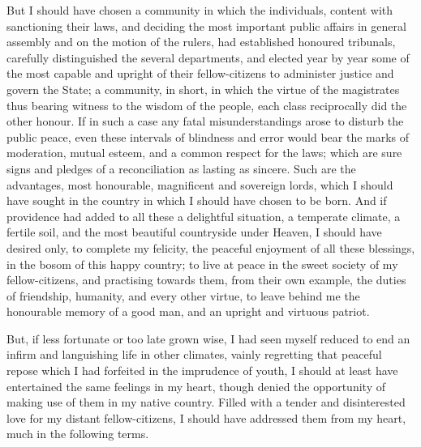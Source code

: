 \documentclass[12pt]{report}
\begin{document}
But I should have chosen a community in which the individuals, content with sanctioning their laws, and deciding the most important public affairs in general assembly and on the motion of the rulers, had established honoured tribunals, carefully distinguished the several departments, and elected year by year some of the most capable and upright of their fellow-citizens to administer justice and govern the State; a community, in short, in which the virtue of the magistrates thus bearing witness to the wisdom of the people, each class reciprocally did the other honour. If in such a case any fatal misunderstandings arose to disturb the public peace, even these intervals of blindness and error would bear the marks of moderation, mutual esteem, and a common respect for the laws; which are sure signs and pledges of a reconciliation as lasting as sincere. Such are the advantages, most honourable, magnificent and sovereign lords, which I should have sought in the country in which I should have chosen to be born. And if providence had added to all these a delightful situation, a temperate climate, a fertile soil, and the most beautiful countryside under Heaven, I should have desired only, to complete my felicity, the peaceful enjoyment of all these blessings, in the bosom of this happy country; to live at peace in the sweet society of my fellow-citizens, and practising towards them, from their own example, the duties of friendship, humanity, and every other virtue, to leave behind me the honourable memory of a good man, and an upright and virtuous patriot.

But, if less fortunate or too late grown wise, I had seen myself reduced to end an infirm and languishing life in other climates, vainly regretting that peaceful repose which I had forfeited in the imprudence of youth, I should at least have entertained the same feelings in my heart, though denied the opportunity of making use of them in my native country. Filled with a tender and disinterested love for my distant fellow-citizens, I should have addressed them from my heart, much in the following terms.
\end{document}
